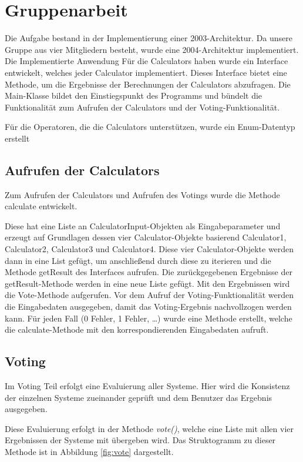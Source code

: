 
\chapter{Gruppenarbeit}\label{cha:Gruppenarbeit}
Die Aufgabe bestand in der Implementierung einer 2003-Architektur. Da unsere Gruppe aus vier Mitgliedern besteht, wurde eine 2004-Architektur implementiert. Die Implementierte Anwendung
Für die Calculators haben wurde ein Interface entwickelt, welches jeder Calculator implementiert. Dieses Interface bietet eine Methode, um die Ergebnisse der Berechnungen der Calculators abzufragen.
Die Main-Klasse bildet den Einstiegspunkt des Programms und bündelt die Funktionalität zum Aufrufen der Calculators und der Voting-Funktionalität.

Für die Operatoren, die die Calculators unterstützen, wurde ein Enum-Datentyp erstellt

\section{Aufrufen der Calculators}
Zum Aufrufen der Calculators und Aufrufen des Votings wurde die Methode calculate entwickelt.

Diese hat eine Liste an CalculatorInput-Objekten als Eingabeparameter und erzeugt auf Grundlagen dessen vier Calculator-Objekte basierend Calculator1, Calculator2, Calculator3 und Calculator4. Diese vier Calculator-Objekte werden dann in eine List gefügt, um anschließend durch diese zu iterieren und die Methode getResult des Interfaces aufrufen. Die zurückgegebenen Ergebnisse der getResult-Methode werden in eine neue Liste gefügt. Mit den Ergebnissen wird die Vote-Methode aufgerufen.
Vor dem Aufruf der Voting-Funktionalität werden die Eingabedaten ausgegeben, damit das Voting-Ergebnis nachvollzogen werden kann.
Für jeden Fall (0 Fehler, 1 Fehler, …) wurde eine Methode erstellt, welche die calculate-Methode mit den korrespondierenden Eingabedaten aufruft.
\section{Voting}

Im Voting Teil erfolgt eine Evaluierung aller Systeme. Hier wird die Konsistenz der einzelnen Systeme zueinander geprüft und dem Benutzer das Ergebnis ausgegeben. 

Diese Evaluierung erfolgt in der Methode \textit{vote()}, welche eine Liste mit allen vier Ergebnissen der Systeme mit übergeben wird. Das Struktogramm zu dieser Methode ist in Abbildung \ref{fig:vote} dargestellt. 

